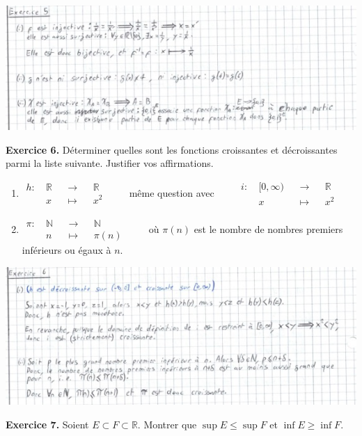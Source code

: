 \documentclass[a4paper, 10pt]{report}
\begin{document}
	\includegraphics{ex05.jpg}
	
	\vspace{5mm}
	\noindent
	\textbf{Exercice 6.} Déterminer quelles sont les fonctions
	croissantes et décroissantes parmi la liste suivante.
	Justifier vos affirmations.
	\begin{enumerate}[label=(\roman*)]
		\item $\begin{aligned}
			h :\ & \mathbb{R} &&\to &&\mathbb{R}\\
			&x &&\mapsto &&x^2
		\end{aligned} \qquad$ même question avec
		$\qquad \begin{aligned}
			i :\ & [0, \infty) &&\to &&\mathbb{R}\\
			&x &&\mapsto &&x^2
		\end{aligned}$
		\vspace{10pt}
		\item $\begin{aligned}
			\pi :\ & \mathbb{N} &&\to &&\mathbb{N}\\
			&n &&\mapsto &&\pi(n)
		\end{aligned} \qquad$ où $\pi(n)$ est le nombre de nombres
		premiers inférieurs ou égaux à $n$.
	\end{enumerate}
	
	\includegraphics{ex06.jpg}
	
	\vspace{5mm}
	\noindent
	\textbf{Exercice 7.} Soient $E \subset F \subset \mathbb{R}$.
	Montrer que $\sup{E} \leq \sup{F}$ et $\inf{E} \geq \inf{F}$.
	
\end{document}
